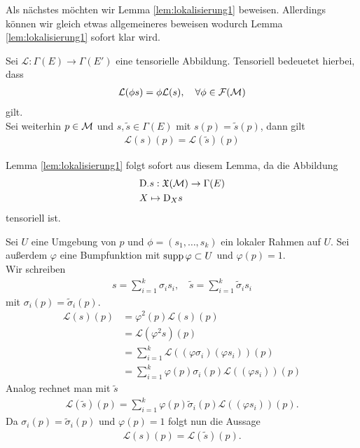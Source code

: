 
Als nächstes möchten wir Lemma \ref{lem:lokalisierung1} beweisen.
Allerdings können wir gleich etwas allgemeineres beweisen wodurch Lemma \ref{lem:lokalisierung1} sofort klar wird.

\begin{lem}
\label{lem:tensorielllokalisierung}
Sei $\mathcal{L}: \Gamma (E) \to \Gamma(E')$ eine tensorielle Abbildung. 
Tensoriell bedeuetet hierbei, dass
\begin{align}
\mathcal{L}(\phi s) = \phi \mathcal{L}(s), \quad \forall \phi \in \mathcal{F}(\mathcal{M})
\end{align}
gilt.\\
Sei weiterhin $p\in \mathcal{M}$ und $s, \tilde{s} \in \Gamma(E)$ mit $s(p) = \tilde{s}(p)$, dann gilt
\begin{align}
\mathcal{L}(s)(p) = \mathcal{L}(\tilde{s})(p)
\end{align} 
\end{lem}
Lemma \ref{lem:lokalisierung1} folgt sofort aus diesem Lemma, da die Abbildung
\begin{align}
&\mathrm{D}_\cdot s : \mathfrak{X}(\mathcal{M}) \to \Gamma (E)\\
& X \mapsto \mathrm{D}_X s
\end{align}
tensoriell ist.

\begin{bew}
Sei $U$ eine Umgebung von $p$ und $\phi = (s_1, \dots, s_k)$ ein lokaler Rahmen auf $U$.
Sei außerdem $\varphi$ eine Bumpfunktion mit $\operatorname{supp} \varphi \subset U$ und $\varphi (p) = 1$.\\
Wir schreiben 
\begin{align}
s = \sum_{i=1}^k \sigma_i s_i , \quad \tilde{s} = \sum_{i=1}^k \tilde{\sigma}_i s_i
\end{align}
mit $\sigma_i (p) = \tilde{\sigma}_i (p)$.
\begin{align}
\mathcal{L}(s)(p) &= \varphi^2 (p) \mathcal{L}(s)(p)\\
&= \mathcal{L}(\varphi^2 s)(p)\\
&= \sum_{i = 1}^k \mathcal{L}((\varphi \sigma_i)(\varphi s_i)) (p)\\
&= \sum_{i = 1}^k \varphi (p) \sigma_i (p) \mathcal{L}((\varphi s_i)) (p) 
\end{align}
Analog rechnet man mit $\tilde{s}$
\begin{align}
\mathcal{L}(\tilde{s})(p) = \sum_{i = 1}^k \varphi (p) \tilde{\sigma}_i (p) \mathcal{L}((\varphi s_i)) (p) .
\end{align}
Da $\sigma_i (p) = \tilde{\sigma}_i (p)$ und $\varphi(p)=1$ folgt nun die Aussage
\begin{align}
\mathcal{L}(s)(p) = \mathcal{L}(\tilde{s})(p).
\end{align}
\end{bew}

